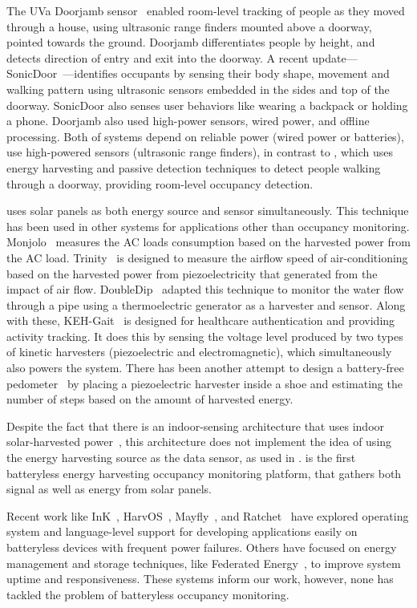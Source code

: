 The UVa Doorjamb sensor~\cite{hnat2012doorjamb} enabled room-level tracking of people as they moved through a house, using ultrasonic range finders mounted above a doorway, pointed towards the ground. Doorjamb differentiates people by height, and detects direction of entry and exit into the doorway. 
A recent update---SonicDoor~\cite{sonicdoor-buildsys2017}---identifies occupants by sensing their body shape, movement and walking pattern using ultrasonic sensors embedded in the sides and top of the doorway. SonicDoor also senses user behaviors like wearing a backpack or holding a phone.
Doorjamb also used high-power sensors, wired power, and offline processing.
Both of systems depend on reliable power (wired power or batteries), use high-powered sensors (ultrasonic range finders), in contrast to \sysname, which uses energy harvesting and passive detection techniques to detect people walking through a doorway, providing room-level occupancy detection.

 \sysname uses solar panels as both energy source and sensor simultaneously. This technique has been used in other systems for applications other than occupancy monitoring. Monjolo~\cite{debruin2013monjolo} measures the AC loads consumption based on the harvested power from the AC load. Trinity~\cite{xiang2013powering} is designed to measure the airflow speed of air-conditioning based on the harvested power from piezoelectricity that generated from the impact of air flow. DoubleDip~\cite{martin2012doubledip} adapted this technique to monitor the water flow through a pipe using a thermoelectric generator as a harvester and sensor. Along with these, KEH-Gait~\cite{xu2017keh} is designed for healthcare authentication and providing activity tracking. It does this by sensing the voltage level produced by two types of kinetic harvesters (piezoelectric and electromagnetic), which simultaneously also powers the system. There has been another attempt to design a battery-free pedometer~\cite{kalantarian2016pedometers} by placing a piezoelectric harvester inside a shoe and estimating the number of steps based on the amount of harvested energy.

Despite the fact that there is an indoor-sensing architecture that uses indoor solar-harvested power~\cite{campbell2014energy}, this architecture does not implement the idea of using the energy harvesting source as the data sensor, as used in \sysname.
\sysname is the first batteryless energy harvesting occupancy monitoring platform, that gathers both signal as well as energy from solar panels.

Recent work like InK~\cite{yildirim2018ink}, HarvOS~\cite{bhatti2017harvos}, Mayfly~\cite{hester2017mayfly}, and Ratchet~\cite{van2016intermittent} have explored operating system and language-level support for developing applications easily on batteryless devices with frequent power failures.
Others have focused on energy management and storage techniques, like  Federated Energy~\cite{jhester:ufop:sensys}, to improve system uptime and responsiveness.
These systems inform our work, however, none has tackled the problem of batteryless occupancy monitoring.

